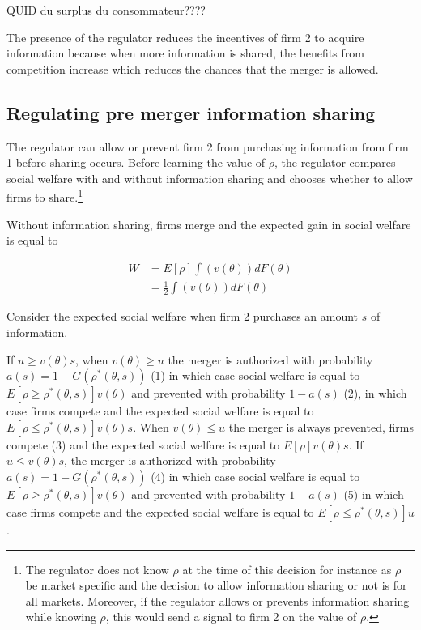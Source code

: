 \documentclass[a4paper,leqno]{article}%
\renewcommand{\t}{\theta}
\begin{document}
\medskip 

QUID du surplus du consommateur???? 

The presence of the regulator reduces the incentives of firm 2 to acquire information because when more information is shared, the benefits from competition increase which reduces the chances that the merger is allowed.

\medskip

\subsection{Regulating pre merger information sharing}

The regulator can allow or prevent firm 2 from purchasing information from firm 1 before sharing occurs. Before learning the value of $\rho$, the regulator compares social welfare with and without information sharing and chooses whether to allow firms to share.\footnote{The regulator does not know $\rho$ at the time of this decision for instance as $\rho$ be market specific and the decision to allow information sharing or not is for all markets. Moreover, if the regulator allows or prevents information sharing while knowing $\rho$, this would send a signal to firm 2 on the value of $\rho$.}

Without information sharing, firms merge and the expected gain in social welfare is equal to 

\begin{equation}
    \begin{aligned}
    W&=E[\rho]\int(v(\t))dF(\t)\\
    &=\frac{1}{2}\int(v(\t))dF(\t)
    \end{aligned}
\end{equation}

Consider the expected social welfare when firm 2 purchases an amount $s$ of information.

If $u\geq v(\t)s$, when $v(\t)\geq u$ the merger is authorized with probability $a(s)=1-G(\rho^*(\t,s))$ (1) in which case social welfare is equal to $E[\rho\geq \rho^*(\t,s)]v(\t)$ and prevented with probability $1-a(s)$ (2), in which case firms compete and the expected social welfare is equal to $E[\rho\leq \rho^*(\t,s)]v(\t)s$. When $v(\t)\leq u$ the merger is always prevented, firms compete (3) and the expected social welfare is equal to $E[\rho]v(\t)s$.
If $u\leq v(\t)s$, the merger is authorized with probability $a(s)=1-G(\rho^*(\t,s))$ (4) in which case social welfare is equal to $E[\rho\geq \rho^*(\t,s)]v(\t)$ and prevented with probability $1-a(s)$ (5) in which case firms compete and the expected social welfare is equal to $E[\rho\leq \rho^*(\t,s)]u$.
\end{document}
